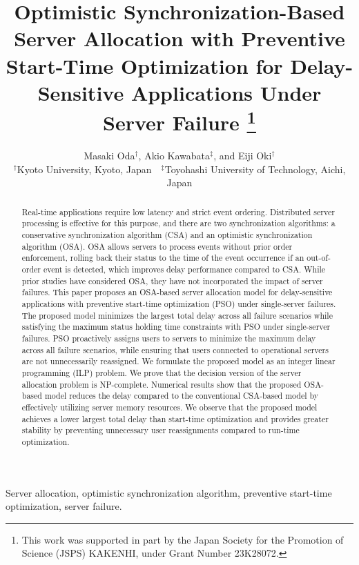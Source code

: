 \documentclass[10pt, letterpaper]{IEEEtran}
\begin{document}
\begin{CJK}{UTF8}{ipxm}

\title{\Large
Optimistic Synchronization-Based Server Allocation with Preventive Start-Time Optimization for Delay-Sensitive Applications Under Server Failure
\thanks{This work was supported in part by the Japan Society for the Promotion of Science (JSPS) KAKENHI, under Grant Number 23K28072.}
}
\author{Masaki Oda$^\dag$, Akio Kawabata$^\ddag$, and Eiji Oki$^\dag$\\
$^\dag$Kyoto University, Kyoto, Japan\ \ $^\ddag$Toyohashi University of Technology, Aichi, Japan} 
\maketitle
\thispagestyle{empty}

\begin{abstract}
Real-time applications require low latency and strict event ordering.  
Distributed server processing is effective for this purpose, and there are two synchronization algorithms: a conservative synchronization algorithm (CSA) and an optimistic synchronization algorithm (OSA).
OSA allows servers to process events without prior order enforcement, rolling back their status to the time of the event occurrence if an out-of-order event is detected, which improves delay performance compared to CSA.
While prior studies have considered OSA, they have not incorporated the impact of server failures. 
This paper proposes an OSA-based server allocation model for delay-sensitive applications with preventive start-time optimization (PSO) under single-server failures.
The proposed model minimizes the largest total delay across all failure scenarios while satisfying the maximum status holding time constraints with PSO under single-server failures.
PSO proactively assigns users to servers to minimize the maximum delay across all failure scenarios, while ensuring that users connected to operational servers are not unnecessarily reassigned.  
We formulate the proposed model as an integer linear programming (ILP) problem.  
We prove that the decision version of the server allocation problem is NP-complete. 
Numerical results show that the proposed OSA-based model reduces the delay compared to the conventional CSA-based model by effectively utilizing server memory resources.
We observe that the proposed model achieves a lower largest total delay than start-time optimization and provides greater stability by preventing unnecessary user reassignments compared to run-time optimization.
\end{abstract}
\begin{IEEEkeywords}
Server allocation, optimistic synchronization algorithm, preventive start-time optimization, server failure.
\end{IEEEkeywords}


\end{CJK}
\end{document}
